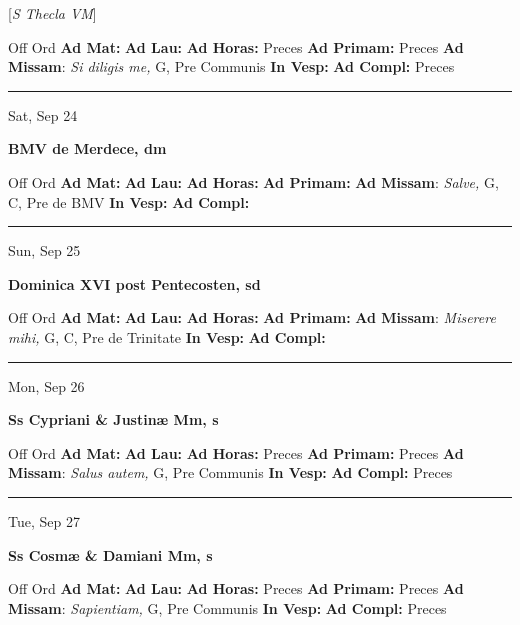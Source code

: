 \documentclass[letterpaper, 10pt]{article}
\begin{document}
[\textit{S Thecla VM}]
\begin{justify}
Off Ord
\textbf{Ad Mat: }
\textbf{Ad Lau: }
\textbf{Ad Horas: }Preces
\textbf{Ad Primam: }Preces
\textbf{Ad Missam}: \textit{Si diligis me,} G, Pre Communis
\textbf{In Vesp: }
\textbf{Ad Compl: }Preces\end{justify}



\hrule
\begin{center}
Sat, Sep 24
\end{center}\textbf{ \large BMV de Merdece, \textnormal{\normalsize dm}}
\begin{justify}
Off Ord
\textbf{Ad Mat: }
\textbf{Ad Lau: }
\textbf{Ad Horas: }
\textbf{Ad Primam: }
\textbf{Ad Missam}: \textit{Salve,} G, C, Pre de BMV
\textbf{In Vesp: }
\textbf{Ad Compl: }\end{justify}



\hrule
\begin{center}
Sun, Sep 25
\end{center}\textbf{ \large Dominica XVI post Pentecosten, \textnormal{\normalsize sd}}
\begin{justify}
Off Ord
\textbf{Ad Mat: }
\textbf{Ad Lau: }
\textbf{Ad Horas: }
\textbf{Ad Primam: }
\textbf{Ad Missam}: \textit{Miserere mihi,} G, C, Pre de Trinitate
\textbf{In Vesp: }
\textbf{Ad Compl: }\end{justify}



\hrule
\begin{center}
Mon, Sep 26
\end{center}\textbf{ \large Ss Cypriani \& Justinæ Mm, \textnormal{\normalsize s}}
\begin{justify}
Off Ord
\textbf{Ad Mat: }
\textbf{Ad Lau: }
\textbf{Ad Horas: }Preces
\textbf{Ad Primam: }Preces
\textbf{Ad Missam}: \textit{Salus autem,} G, Pre Communis
\textbf{In Vesp: }
\textbf{Ad Compl: }Preces\end{justify}



\hrule
\begin{center}
Tue, Sep 27
\end{center}\textbf{ \large Ss Cosmæ \& Damiani Mm, \textnormal{\normalsize s}}
\begin{justify}
Off Ord
\textbf{Ad Mat: }
\textbf{Ad Lau: }
\textbf{Ad Horas: }Preces
\textbf{Ad Primam: }Preces
\textbf{Ad Missam}: \textit{Sapientiam,} G, Pre Communis
\textbf{In Vesp: }
\textbf{Ad Compl: }Preces\end{justify}
\end{document}
